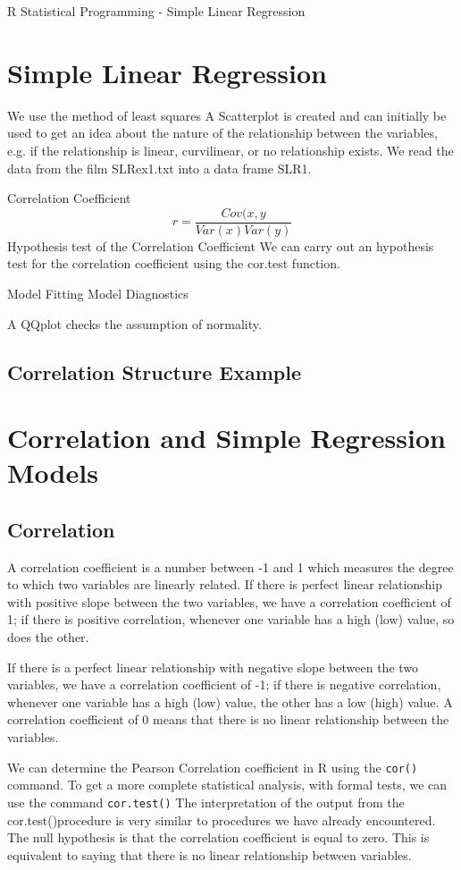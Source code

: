 R Statistical Programming - Simple Linear Regression
 
\section{Simple Linear Regression}
We use the method of least squares
A Scatterplot is created and can initially be used to get an idea
about the nature of the relationship between the variables, e.g. if the
relationship is linear, curvilinear, or no relationship exists.
We read the data from the film SLRex1.txt into a data frame SLR1.

Correlation Coefficient
\[r = \frac{Cov(x,y}{Var(x)Var(y)}\]
Hypothesis test of the Correlation Coefficient
We can carry out an hypothesis test for the correlation coefficient
using the cor.test function.

Model Fitting
Model Diagnostics
 
A QQplot checks the assumption of normality.
 


\subsection{Correlation Structure Example}


\newpage
\section{Correlation and Simple Regression Models}

\subsection{Correlation}

A correlation coefficient is a number between -1 and 1 which measures the degree to which two variables are linearly related. If there is perfect linear relationship with positive slope between the two variables, we have a correlation coefficient of 1; if there is positive correlation, whenever one variable has a high (low) value, so does the other.

If there is a perfect linear relationship with negative slope between the two variables, we have a correlation coefficient of -1; if there is negative correlation, whenever one variable has a high (low) value, the other has a low (high) value.
A correlation coefficient of 0 means that there is no linear relationship between the variables.

We can determine the Pearson Correlation coefficient in R using the \texttt{cor()} command.
To get a more complete statistical analysis, with formal tests, we can use the command \texttt{cor.test()}
The interpretation of the output from the cor.test()procedure is very similar to procedures we have already encountered. The null hypothesis is that the correlation coefficient is equal to zero. This is equivalent to saying that there is no linear relationship between variables.


